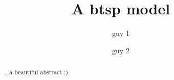 \documentclass{article}
\title{A btsp model}
\author[1]{guy 1}
\author[2]{guy 2}
\affil[1]{city 1}
\affil[2]{city 2}
\date{} %
\begin{document}
\maketitle

\begin{abstract}
    .. a beautiful abstract :)
\end{abstract}



\hfill \break
\vspace {0.5cm}












% 



\newpage


\end{document}
